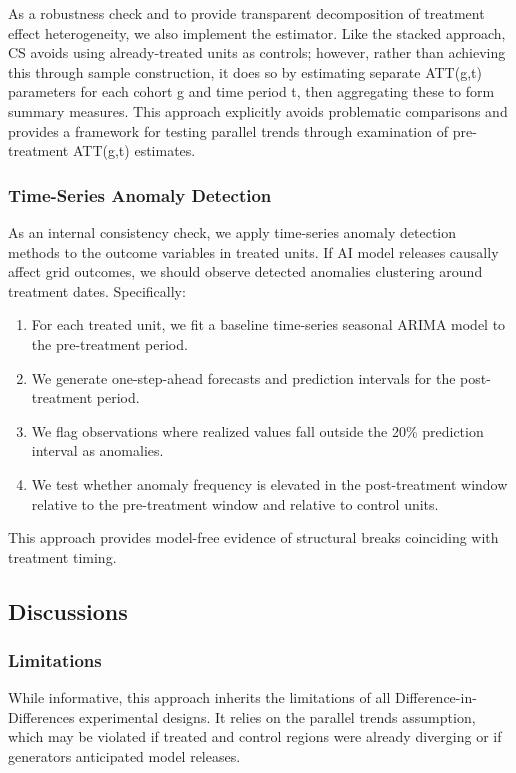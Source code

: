 \documentclass[sigconf,authordraft]{acmart}
\begin{document}
As a robustness check and to provide transparent decomposition of treatment effect heterogeneity, we also implement the \citet{callaway2021difference} estimator. Like the stacked approach, CS avoids using already-treated units as controls; however, rather than achieving this through sample construction, it does so by estimating separate ATT(g,t) parameters for each cohort g and time period t, then aggregating these to form summary measures. This approach explicitly avoids problematic comparisons and provides a framework for testing parallel trends through examination of pre-treatment ATT(g,t) estimates. 
\subsubsection{Time-Series Anomaly Detection}

As an internal consistency check, we apply time-series anomaly detection methods to the outcome variables in treated units. If AI model releases causally affect grid outcomes, we should observe detected anomalies clustering around treatment dates. Specifically:
\begin{enumerate}
    \item For each treated unit, we fit a baseline time-series seasonal ARIMA model to the pre-treatment period.
    \item We generate one-step-ahead forecasts and prediction intervals for the post-treatment period.
    \item We flag observations where realized values fall outside the 20\% prediction interval as anomalies.
    \item We test whether anomaly frequency is elevated in the post-treatment window relative to the pre-treatment window and relative to control units.
\end{enumerate}
This approach provides model-free evidence of structural breaks coinciding with treatment timing.

\subsection{Discussions}

\subsubsection{Limitations}

While informative, this approach inherits the limitations of all Difference-in-Differences experimental designs. It relies on the parallel trends assumption, which may be violated if treated and control regions were already diverging or if generators anticipated model releases.
\end{document}
